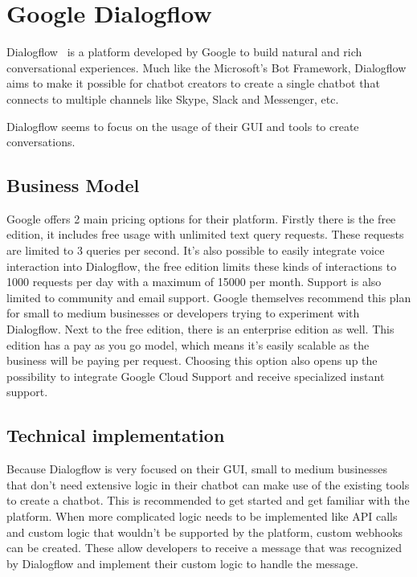 \chapter{Google Dialogflow}

Dialogflow~\cite{dialogflow} is a platform developed by Google to build natural and rich conversational experiences. Much like the Microsoft's Bot Framework, Dialogflow aims to make it possible for chatbot creators to create a single chatbot that connects to multiple channels like Skype, Slack and Messenger, etc.

Dialogflow seems to focus on the usage of their GUI and tools to create conversations.

\section{Business Model}

Google offers 2 main pricing options for their platform. Firstly there is the free edition, it includes free usage with unlimited text query requests. These requests are limited to 3 queries per second. It's also possible to easily integrate voice interaction into Dialogflow, the free edition limits these kinds of interactions to 1000 requests per day with a maximum of 15000 per month. Support is also limited to community and email support. Google themselves recommend this plan for small to medium businesses or developers trying to experiment with Dialogflow. Next to the free edition, there is an enterprise edition as well. This edition has a pay as you go model, which means it's easily scalable as the business will be paying per request. Choosing this option also opens up the possibility to integrate Google Cloud Support and receive specialized instant support.

\section{Technical implementation}

Because Dialogflow is very focused on their GUI, small to medium businesses that don't need extensive logic in their chatbot can make use of the existing tools to create a chatbot. This is recommended to get started and get familiar with the platform. When more complicated logic needs to be implemented like API calls and custom logic that wouldn't be supported by the platform, custom webhooks can be created. These allow developers to receive a message that was recognized by Dialogflow and implement their custom logic to handle the message.

